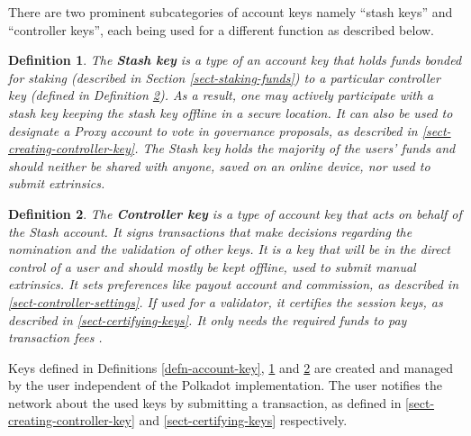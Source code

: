 \documentclass{book}
\newcommand{\tmstrong}[1]{\textbf{#1}}
\newcommand{\tmtextbf}[1]{{\bfseries{#1}}}
\newtheorem{definition}{Definition}
\providecommand{\tmstrong}[1]{\tmtextbf{#1}}
\providecommand{\tmtextbf}[1]{\tmtextbf{#1}}
\newtheorem{definition}{Definition}
\begin{document}
There are two prominent subcategories of account keys namely ``stash keys''
and ``controller keys'', each being used for a different function as described
below.

\begin{definition}
  The \label{defn-stash-key}{\tmstrong{Stash key}} is a type of an account key
  that holds funds bonded for staking (described in Section
  \ref{sect-staking-funds}) to a particular controller key (defined in
  Definition \ref{defn-controller-key}). As a result, one may actively
  participate with a stash key keeping the stash key offline in a secure
  location. It can also be used to designate a Proxy account to vote in
  governance proposals, as described in \ref{sect-creating-controller-key}.
  The Stash key holds the majority of the users' funds and should neither be
  shared with anyone, saved on an online device, nor used to submit
  extrinsics.
\end{definition}

\begin{definition}
  \label{defn-controller-key}The {\tmstrong{Controller key}} is a type of
  account key that acts on behalf of the Stash account. It signs transactions
  that make decisions regarding the nomination and the validation of other
  keys. It is a key that will be in the direct control of a user and should
  mostly be kept offline, used to submit manual extrinsics. It sets
  preferences like payout account and commission, as described in
  \ref{sect-controller-settings}. If used for a validator, it certifies the
  session keys, as described in \ref{sect-certifying-keys}. It only needs the
  required funds to pay transaction fees {}.
\end{definition}

Keys defined in Definitions \ref{defn-account-key}, \ref{defn-stash-key} and
\ref{defn-controller-key} are created and managed by the user independent of
the Polkadot implementation. The user notifies the network about the used keys
by submitting a transaction, as defined in \ref{sect-creating-controller-key}
and \ref{sect-certifying-keys} respectively.
\end{document}
